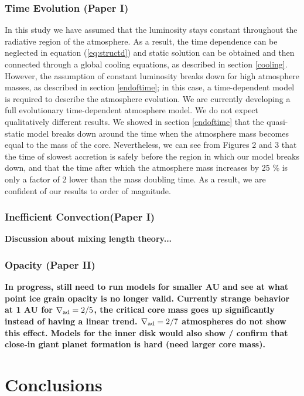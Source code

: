 \documentclass[apj]{emulateapj}
\newcommand{\delad}{\nabla_{\rm ad}}
\begin{document}
 \subsubsection{Time Evolution \textbf{(Paper I)}}
 
 In this study we have assumed that the luminosity stays constant throughout the radiative region of the atmosphere. As a result, the time dependence can be neglected in equation (\ref{eq:structd}) and static solution can be obtained and then connected through a global cooling equations, as described in section \ref{cooling}. However, the assumption of constant luminosity breaks down for high atmosphere masses, as described in section \ref{endoftime}; in this case, a time-dependent model is required to describe the atmosphere evolution. We are currently developing a full evolutionary time-dependent atmosphere model. We do not expect qualitatively different results. We showed in section \ref{endoftime} that the quasi-static model breaks down around the time when the atmosphere mass becomes equal to the mass of the core. Nevertheless, we can see from Figures 2 and 3 that the time of slowest accretion is safely before the region in which our model breaks down, and that the time after which the atmosphere mass increases by 25 \% is only a factor of 2 lower than the mass doubling time. As a result, we are confident of our results to order of magnitude.
 
 \subsubsection{Inefficient Convection\textbf{(Paper I)}}
 
\textbf{Discussion about mixing length theory...} 

\subsubsection{Opacity \textbf{(Paper II)}}

\textbf{In progress, still need to run models for smaller AU and see at what point ice grain opacity is no longer valid. Currently strange behavior at 1 AU for $\delad=2/5$, the critical core mass goes up significantly instead of having a linear trend. $\delad=2/7$ atmospheres do not show this effect. Models for the inner disk would also show / confirm that close-in giant planet formation is hard (need larger core mass).}
 
 
 \section{Conclusions}
 \label{conclusions}
 
\end{document}
